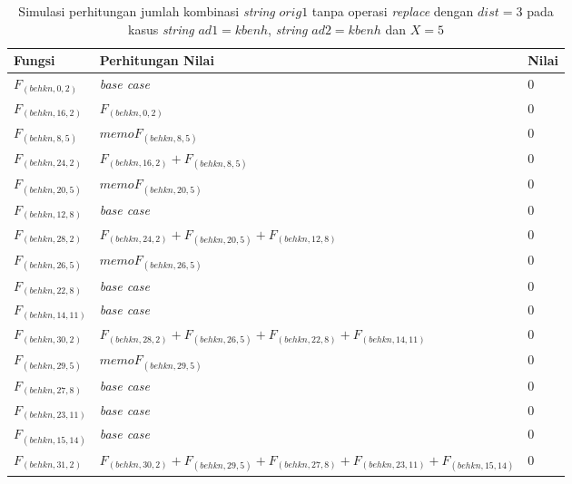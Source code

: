 \begin{appendices}
  
  
  \begin{table}[H]
  	\centering
  	\begin{tabular} {|p{3cm}|p{5cm}|p{1cm}|} \hline
  		Fungsi & Perhitungan Nilai & Nilai \\ \hline
  		$ F_{(behkn, 0, 2)} $ & \textit{base case} & $ 0 $ \\ \hline
  		$ F_{(behkn, 16, 2)}  $ & $F_{(behkn, 0, 2)}$ & $ 0 $ \\ \hline
  		$ F_{(behkn, 8, 5)}  $ & $memoF_{(behkn, 8, 5)}$ & $ 0 $ \\ \hline
  		$ F_{(behkn, 24, 2)}  $ & $F_{(behkn, 16, 2)} + F_{(behkn, 8, 5)}$ & $ 0 $ \\ \hline
  		$ F_{(behkn, 20, 5)}  $ & $memoF_{(behkn, 20, 5)}$ & $ 0 $ \\ \hline
  		$ F_{(behkn, 12, 8)} $ & \textit{base case} & $ 0 $ \\ \hline
  		$ F_{(behkn, 28, 2)}  $ & $F_{(behkn, 24, 2)} + F_{(behkn, 20, 5)} + F_{(behkn, 12, 8)}$ & $ 0 $ \\ \hline
  		$ F_{(behkn, 26, 5)}  $ & $memoF_{(behkn, 26, 5)}$ & $ 0 $ \\ \hline
  		$ F_{(behkn, 22, 8)} $ & \textit{base case} & $ 0 $ \\ \hline
  		$ F_{(behkn, 14, 11)} $ & \textit{base case} & $ 0 $ \\ \hline
  		$ F_{(behkn, 30, 2)}  $ & $F_{(behkn, 28, 2)} + F_{(behkn, 26, 5)} + F_{(behkn, 22, 8)} + F_{(behkn, 14, 11)}$ & $ 0 $ \\ \hline
  		$ F_{(behkn, 29, 5)}  $ & $memoF_{(behkn, 29, 5)}$ & $ 0 $ \\ \hline
  		$ F_{(behkn, 27, 8)} $ & \textit{base case} & $ 0 $ \\ \hline
  		$ F_{(behkn, 23, 11)} $ & \textit{base case} & $ 0 $ \\ \hline
  		$ F_{(behkn, 15, 14)} $ & \textit{base case} & $ 0 $ \\ \hline
  		\rowcolor{LightCyan}
  		$ F_{(behkn, 31, 2)}  $ & $F_{(behkn, 30, 2)} + F_{(behkn, 29, 5)} + F_{(behkn, 27, 8)} + F_{(behkn, 23, 11)} + F_{(behkn, 15, 14)}$ & $ 0 $ \\ \hline
  	\end{tabular}\caption{Simulasi perhitungan jumlah kombinasi \textit{string} $ orig1 $ tanpa operasi \textit{replace} dengan $ dist= 3  $ pada kasus \textit{string} $ ad1=kbenh $, \textit{string} $ ad2=kbenh $ dan $ X=5 $}
  	\label{tab:f_3_orig1_3_1}
  \end{table}
  

\end{appendices}
